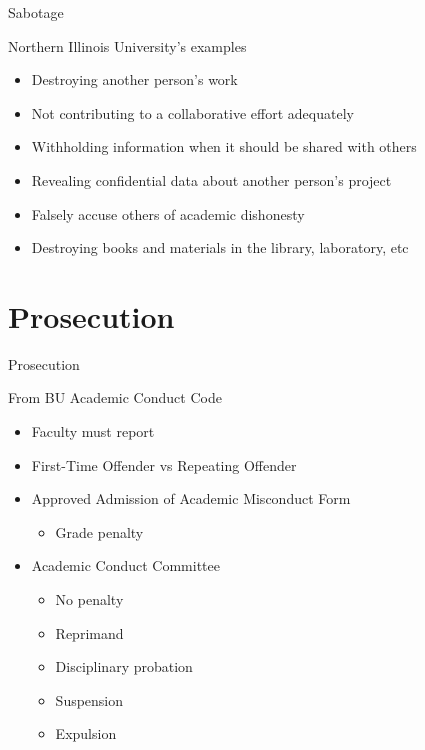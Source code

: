 		\begin{frame}{Sabotage}
				
			Northern Illinois University's examples

			\begin{itemize}
				\item 
					Destroying another person's work
				\item 
					Not contributing to a collaborative effort adequately
				\item 
					Withholding information when it should be shared with others
				\item 
					Revealing confidential data about another person's project
				\item 
					Falsely accuse others of academic dishonesty
				\item
					Destroying books and materials in the library, laboratory, etc
			\end{itemize}

		\end{frame}

\section{Prosecution}

	\begin{frame}{Prosecution}

		From BU Academic Conduct Code

		\begin{itemize}
			\item 
				Faculty must report
			\item 
				First-Time Offender vs Repeating Offender
			\item 
				Approved Admission of Academic Misconduct Form
				\begin{itemize}
					\item 
						Grade penalty
				\end{itemize}
			\item
				Academic Conduct Committee
				\begin{itemize}
					\item 
						No penalty
					\item 
						Reprimand
					\item 
						Disciplinary probation
					\item
						Suspension
					\item
						Expulsion
				\end{itemize}
		\end{itemize}

	\end{frame}
